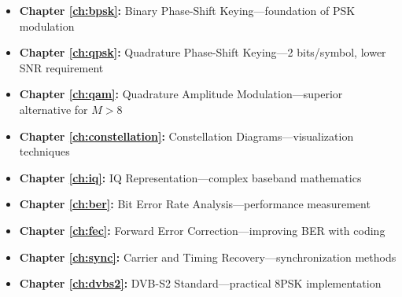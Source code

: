 \begin{itemize}
\item \textbf{Chapter \ref{ch:bpsk}:} Binary Phase-Shift Keying---foundation of PSK modulation
\item \textbf{Chapter \ref{ch:qpsk}:} Quadrature Phase-Shift Keying---2 bits/symbol, lower SNR requirement
\item \textbf{Chapter \ref{ch:qam}:} Quadrature Amplitude Modulation---superior alternative for $M > 8$
\item \textbf{Chapter \ref{ch:constellation}:} Constellation Diagrams---visualization techniques
\item \textbf{Chapter \ref{ch:iq}:} IQ Representation---complex baseband mathematics
\item \textbf{Chapter \ref{ch:ber}:} Bit Error Rate Analysis---performance measurement
\item \textbf{Chapter \ref{ch:fec}:} Forward Error Correction---improving BER with coding
\item \textbf{Chapter \ref{ch:sync}:} Carrier and Timing Recovery---synchronization methods
\item \textbf{Chapter \ref{ch:dvbs2}:} DVB-S2 Standard---practical 8PSK implementation
\end{itemize}
